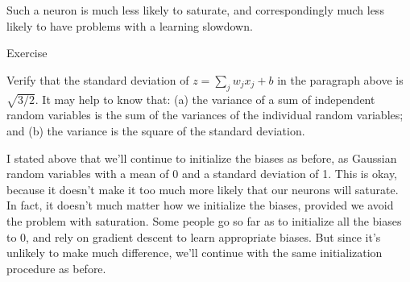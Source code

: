 \documentclass[a4paper,twoside,10pt]{book}
\begin{document}
Such a neuron is much less likely to saturate, and correspondingly much less likely to have problems with a learning slowdown.

\begin{exercize}{Exercise}
	\item Verify that the standard deviation of $z=\sum_jw_jx_j+b$ in the paragraph above is $\sqrt{3/2}$. It may help to know that: (a) the variance of a sum of independent random variables is the sum of the variances of the individual random variables; and (b) the variance is the square of the standard deviation.
\end{exercize}
I stated above that we'll continue to initialize the biases as before, as Gaussian random variables with a mean of 0 and a standard deviation of 1. This is okay, because it doesn't make it too much more likely that our neurons will saturate. In fact, it doesn't much matter how we initialize the biases, provided we avoid the problem with saturation. Some people go so far as to initialize all the biases to 0, and rely on gradient descent to learn appropriate biases. But since it's unlikely to make much difference, we'll continue with the same initialization procedure as before.
\end{document}
